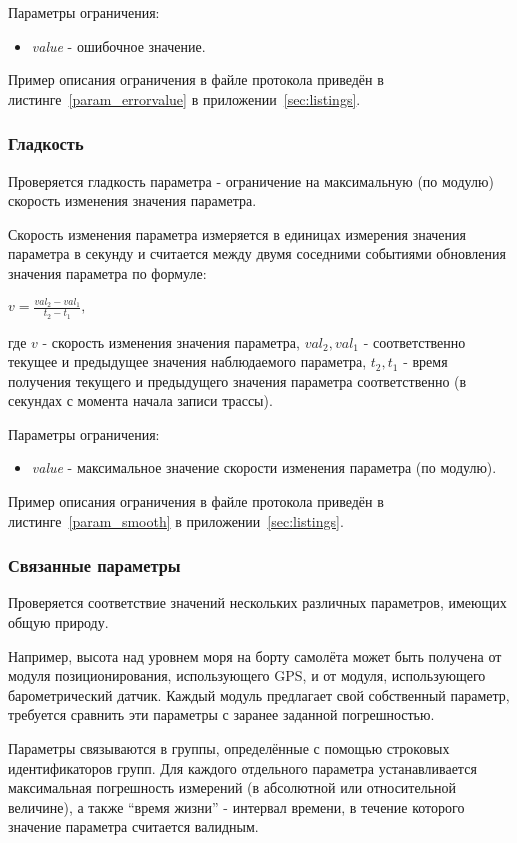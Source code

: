 Параметры ограничения:
\begin{itemize}
 \item \textit{value} - ошибочное значение.
\end{itemize}

Пример описания ограничения в файле протокола приведён в 
листинге~\ref{param_errorvalue} в приложении~\ref{sec:listings}.


\subsubsection{Гладкость}

Проверяется гладкость параметра - ограничение на максимальную (по модулю) 
скорость изменения значения параметра.

Скорость изменения параметра измеряется в единицах измерения значения параметра 
в секунду и считается между двумя соседними событиями обновления значения 
параметра по формуле:

$
v = \frac{val_2 - val_1}{t_2 - t_1},
$

где $v$ - скорость изменения значения параметра, $val_2, val_1$ - 
соответственно текущее и предыдущее значения наблюдаемого параметра, $t_2, t_1$ 
- время получения текущего и предыдущего значения параметра соответственно (в 
секундах с момента начала записи трассы).

Параметры ограничения:
\begin{itemize}
 \item \textit{value} - максимальное значение скорости изменения параметра (по 
модулю).
\end{itemize}

Пример описания ограничения в файле протокола приведён в 
листинге~\ref{param_smooth} в приложении~\ref{sec:listings}.


\subsubsection{Связанные параметры}

Проверяется соответствие значений нескольких различных параметров, имеющих 
общую природу.

Например, высота над уровнем моря на борту самолёта может быть получена от 
модуля позиционирования, использующего GPS, и от модуля, использующего 
барометрический датчик. Каждый модуль предлагает свой собственный параметр, 
требуется сравнить эти параметры с заранее заданной погрешностью.

Параметры связываются в группы, определённые с помощью 
строковых идентификаторов групп. Для каждого отдельного 
параметра устанавливается максимальная погрешность измерений (в абсолютной или 
относительной величине), а также ``время жизни'' - интервал времени, в течение 
которого значение параметра считается валидным.

